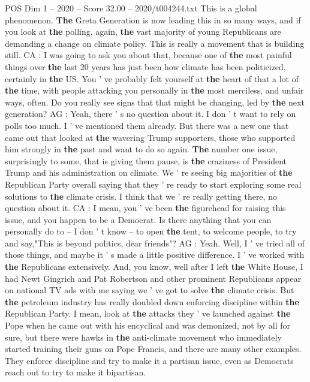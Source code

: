 \begin{textsample}{POS Dim 1 – 2020 – Score 32.00 – 2020/t004244.txt}
This is a global phenomenon. \textbf{The} Greta Generation is now leading this in so many ways, and if you look at \textbf{the} polling, again, \textbf{the} vast majority of young Republicans are demanding a change on climate policy.
This is really a movement that is building still.
CA : I was going to ask you about that, because one of \textbf{the} most painful things over \textbf{the} last 20 years has just been how climate has been politicized, certainly in \textbf{the} US.
You ' ve probably felt yourself at \textbf{the} heart of that a lot of \textbf{the} time, with people attacking you personally in \textbf{the} most merciless, and unfair ways, often.
Do you really see signs that that might be changing, led by \textbf{the} next generation?
AG : Yeah, there ' s no question about it.
I don ' t want to rely on polls too much.
I ' ve mentioned them already.
But there was a new one that came out that looked at \textbf{the} wavering Trump supporters, those who supported him strongly in \textbf{the} past and want to do so again. \textbf{The} number one issue, surprisingly to some, that is giving them pause, is \textbf{the} craziness of President Trump and his administration on climate.
We ' re seeing big majorities of \textbf{the} Republican Party overall saying that they ' re ready to start exploring some real solutions to \textbf{the} climate crisis.
I think that we ' re really getting there, no question about it.
CA : I mean, you ' ve been \textbf{the} figurehead for raising this issue, and you happen to be a Democrat.
Is there anything that you can personally do to -- I don ' t know -- to open \textbf{the} tent, to welcome people, to try and say,"This is beyond politics, dear friends"?
AG : Yeah.
Well, I ' ve tried all of those things, and maybe it ' s made a little positive difference.
I ' ve worked with \textbf{the} Republicans extensively.
And, you know, well after I left \textbf{the} White House, I had Newt Gingrich and Pat Robertson and other prominent Republicans appear on national TV ads with me saying we ' ve got to solve \textbf{the} climate crisis.
But \textbf{the} petroleum industry has really doubled down enforcing discipline within \textbf{the} Republican Party.
I mean, look at \textbf{the} attacks they ' ve launched against \textbf{the} Pope when he came out with his encyclical and was demonized, not by all for sure, but there were hawks in \textbf{the} anti-climate movement who immediately started training their guns on Pope Francis, and there are many other examples.
They enforce discipline and try to make it a partisan issue, even as Democrats reach out to try to make it bipartisan.

\end{textsample}
